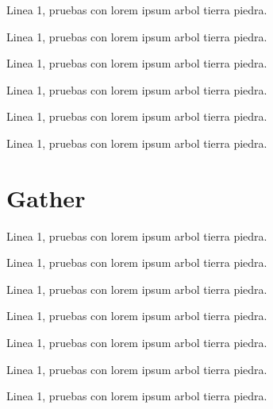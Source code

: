 
Linea 1, pruebas con lorem ipsum arbol tierra piedra.


Linea 1, pruebas con lorem ipsum arbol tierra piedra.


Linea 1, pruebas con lorem ipsum arbol tierra piedra.


Linea 1, pruebas con lorem ipsum arbol tierra piedra.


Linea 1, pruebas con lorem ipsum arbol tierra piedra.


Linea 1, pruebas con lorem ipsum arbol tierra piedra.

\newpage
\section{Gather}

Linea 1, pruebas con lorem ipsum arbol tierra piedra.


Linea 1, pruebas con lorem ipsum arbol tierra piedra.


Linea 1, pruebas con lorem ipsum arbol tierra piedra.


Linea 1, pruebas con lorem ipsum arbol tierra piedra.


Linea 1, pruebas con lorem ipsum arbol tierra piedra.


Linea 1, pruebas con lorem ipsum arbol tierra piedra.


Linea 1, pruebas con lorem ipsum arbol tierra piedra.


